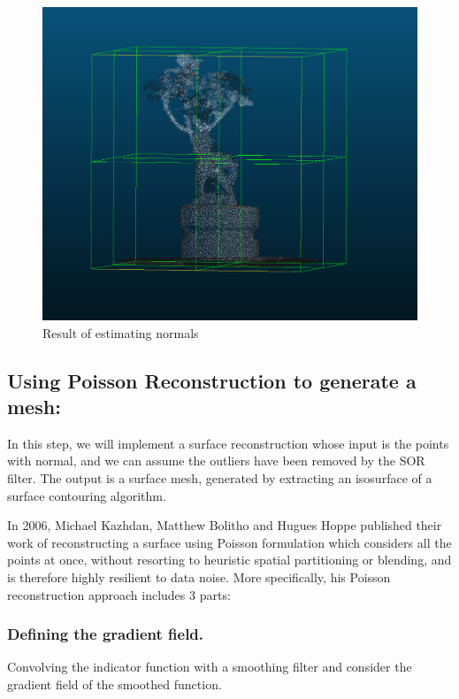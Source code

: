 \documentclass[runningheads,a4paper]{llncs}
\begin{document}
\begin{figure}
\centering
\includegraphics[scale=0.3]{estimate_normal.PNG}
\caption{Result of estimating normals}
\label{fig:estimate-normal}
\end{figure}

\subsection{Using Poisson Reconstruction to generate a mesh:}
In this step, we will implement a surface reconstruction whose input is the points with normal, and we can assume the outliers have been removed by the SOR filter. The output is a surface mesh, generated by extracting an isosurface of a surface contouring algorithm.

In 2006, Michael Kazhdan, Matthew Bolitho and Hugues Hoppe published their work of reconstructing a surface using Poisson formulation which considers all the points at once, without resorting to heuristic spatial partitioning or blending, and is therefore highly resilient to data noise\cite{16}. More specifically, his Poisson reconstruction approach includes 3 parts:

\subsubsection{Defining the gradient field.}Convolving the indicator function with a smoothing filter and consider the gradient field of the smoothed function.
\end{document}
